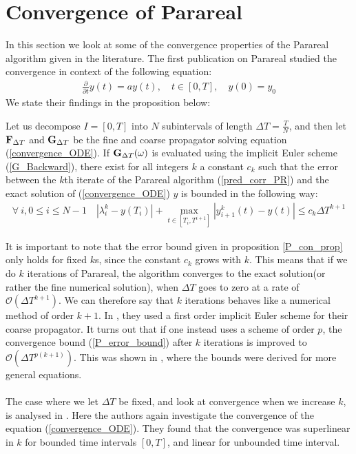 \section{Convergence of Parareal}
In this section we look at some of the convergence properties of the Parareal algorithm given in the literature. The first publication on Parareal \cite{lions2001resolution} studied the convergence in context of the following equation: 
\begin{align}
\frac{\partial}{\partial t} y(t)=ay(t),\quad t\in [0,T],\quad y(0)=y_0\label{convergence_ODE}
\end{align}
We state their findings in the proposition below:
\begin{proposition} \label{P_con_prop}
Let us decompose $I=[0,T]$ into $N$ subintervals of length $\Delta T = \frac{T}{N}$, and then let $\bold F_{\Delta T}$ and $\bold G_{\Delta T}$ be the fine and coarse propagator solving equation (\ref{convergence_ODE}). If $\bold G_{\Delta T}(\omega)$  is evaluated using the implicit Euler scheme (\ref{G_Backward}), there exist for all integers $k$ a constant $c_k$ such that the error between the $k$th iterate of the Parareal algorithm (\ref{pred_corr_PR}) and the exact solution of (\ref{convergence_ODE}) $y$ is bounded in the following way:
\begin{align}
\forall \ i,0\leq i\leq N-1 \quad |\lambda_i^k-y(T_i)| + \max_{t\in[T_{i},T^{i+1}]}|y_{i+1}^k(t)-y(t)| \leq c_k\Delta T^{k+1} \label{P_error_bound}
\end{align}
\end{proposition}
\noindent
It is important to note that the error bound given in proposition \ref{P_con_prop} only holds for fixed $k$s, since the constant $c_k$ grows with $k$. This means that if we do $k$ iterations of Parareal, the algorithm converges to the exact solution(or rather the fine numerical solution), when $\Delta T$ goes to zero at a rate of $\mathcal{O}(\Delta T^{k+1})$. We can therefore say that $k$ iterations behaves like a numerical method of order $k+1$. In \cite{lions2001resolution}, they used a first order implicit Euler scheme for their coarse propagator. It turns out that if one instead uses a scheme of order $p$, the convergence bound (\ref{P_error_bound}) after $k$ iterations is improved to $\mathcal{O}(\Delta T^{p(k+1)})$. This was shown in \cite{bal2005convergence}, where the bounds were derived for more general equations. 
\\
\\
The case where we let $\Delta T$ be fixed, and look at convergence when we increase $k$, is analysed in \cite{gander2007analysis}. Here the authors again investigate the convergence of the equation (\ref{convergence_ODE}). They found that the convergence was superlinear in $k$ for bounded time intervals $[0,T]$, and linear for unbounded time interval. 
